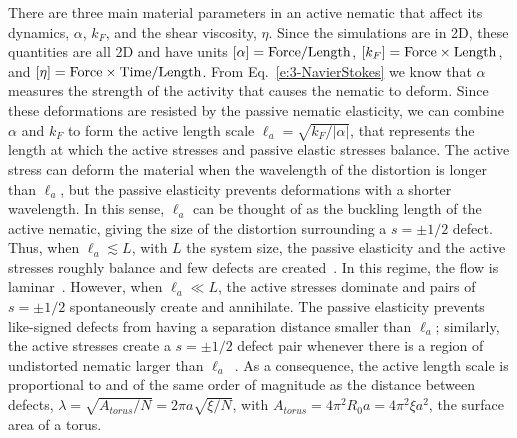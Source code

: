 There are three main material parameters in an active nematic that affect its dynamics, $\alpha$, $k_F$, and the shear viscosity, $\eta$.
Since the simulations are in 2D, these quantities are all 2D and have units $[\alpha] = {\rm Force}/{\rm Length}$, $[k_F] = {\rm Force} \times {\rm Length}$, and $[\eta] = {\rm Force} \times {\rm Time} / {\rm Length}$.
From Eq.~\ref{e:3-NavierStokes} we know that $\alpha$ measures the strength of the activity that causes the nematic to deform.
Since these deformations are resisted by the passive nematic elasticity, we can combine $\alpha$ and $k_F$ to form the active length scale $\ell_a = \sqrt{k_F / |\alpha|}$, that represents the length at which the active stresses and passive elastic stresses balance.
The active stress can deform the material when the wavelength of the distortion is longer than $\ell_a$, but the passive elasticity prevents deformations with a shorter wavelength.
In this sense, $\ell_a$ can be thought of as the buckling length of the active nematic, giving the size of the distortion surrounding a $s = \pm 1/2$ defect.
Thus, when $\ell_a \lesssim L$, with $L$ the system size, the passive elasticity and the active stresses roughly balance and few defects are created~\cite{RN7}.
In this regime, the flow is laminar~\cite{RN7}.
However, when $\ell_a \ll L$, the active stresses dominate and pairs of $s = \pm 1/2$ spontaneously create and annihilate.
The passive elasticity prevents like-signed defects from having a separation distance smaller than $\ell_a$; similarly, the active stresses create a $s = \pm 1/2$ defect pair whenever there is a region of undistorted nematic larger than $\ell_a$~\cite{RN7}.
As a consequence, the active length scale is proportional to and of the same order of magnitude as the distance between defects, $\lambda = \sqrt{A_{torus}/N} = 2 \pi a \sqrt{\xi/N}$, with $A_{torus} = 4 \pi^2 R_0 a = 4 \pi^2 \xi a^2$, the surface area of a torus.

